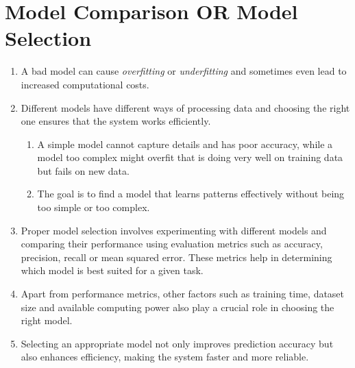 \section{Model Comparison OR Model Selection}

\begin{enumerate}
    \item A bad model can cause \textit{overfitting} or \textit{underfitting} and sometimes even lead to increased computational costs.
    \hfill \cite{geeksforgeeks/machine-learning/model-selection-for-machine-learning}

    \item Different models have different ways of processing data and choosing the right one ensures that the system works efficiently.
    \hfill \cite{geeksforgeeks/machine-learning/model-selection-for-machine-learning}
    \begin{enumerate}
        \item A simple model cannot capture details and has poor accuracy, while a model too complex might overfit that is doing very well on training data but fails on new data.
        \hfill \cite{geeksforgeeks/machine-learning/model-selection-for-machine-learning}

        \item The goal is to find a model that learns patterns effectively without being too simple or too complex.
        \hfill \cite{geeksforgeeks/machine-learning/model-selection-for-machine-learning}
    \end{enumerate}

    \item Proper model selection involves experimenting with different models and comparing their performance using evaluation metrics such as accuracy, precision, recall or mean squared error.
    These metrics help in determining which model is best suited for a given task.
    \hfill \cite{geeksforgeeks/machine-learning/model-selection-for-machine-learning}

    \item Apart from performance metrics, other factors such as training time, dataset size and available computing power also play a crucial role in choosing the right model.
    \hfill \cite{geeksforgeeks/machine-learning/model-selection-for-machine-learning}

    \item Selecting an appropriate model not only improves prediction accuracy but also enhances efficiency, making the system faster and more reliable.
    \hfill \cite{geeksforgeeks/machine-learning/model-selection-for-machine-learning}
\end{enumerate}



